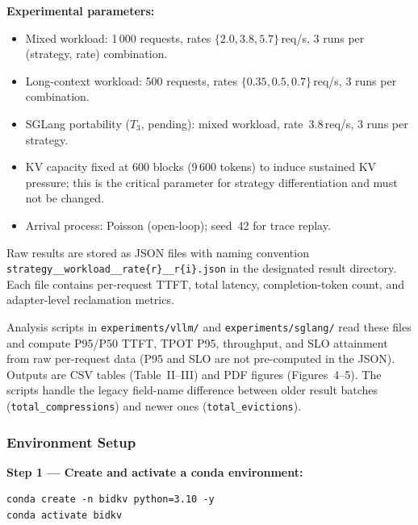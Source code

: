 \documentclass[conference]{IEEEtran}
\begin{document}
\textbf{Experimental parameters:}
\begin{itemize}
  \item Mixed workload: 1\,000 requests, rates $\{2.0, 3.8, 5.7\}$\,req/s,
    3 runs per (strategy, rate) combination.
  \item Long-context workload: 500 requests,
    rates $\{0.35, 0.5, 0.7\}$\,req/s, 3 runs per combination.
  \item SGLang portability ($T_3$, pending): mixed workload,
    rate~3.8\,req/s, 3 runs per strategy.
  \item KV capacity fixed at 600 blocks (9\,600 tokens) to induce
    sustained KV pressure; this is the critical parameter for
    strategy differentiation and must not be changed.
  \item Arrival process: Poisson (open-loop); seed~42 for trace replay.
\end{itemize}

\artout

Raw results are stored as JSON files with naming convention
\texttt{strategy\_\_workload\_\_rate\{r\}\_\_r\{i\}.json}
in the designated result directory.
Each file contains per-request TTFT, total latency, completion-token count,
and adapter-level reclamation metrics.

Analysis scripts in \texttt{experiments/vllm/} and
\texttt{experiments/sglang/} read these files and compute P95/P50
TTFT, TPOT P95, throughput, and SLO attainment from raw
per-request data (P95 and SLO are not pre-computed in the JSON).
Outputs are CSV tables (Table~II--III) and PDF figures
(Figures~4--5).
The scripts handle the legacy field-name difference between older
result batches (\texttt{total\_compressions}) and newer ones
(\texttt{total\_evictions}).


\newpage
\appendixAE


\artin

\subsubsection*{Environment Setup}

\textbf{Step 1 --- Create and activate a conda environment:}
\begingroup\footnotesize\begin{verbatim}
conda create -n bidkv python=3.10 -y
conda activate bidkv
\end{verbatim}
\endgroup
\end{document}
